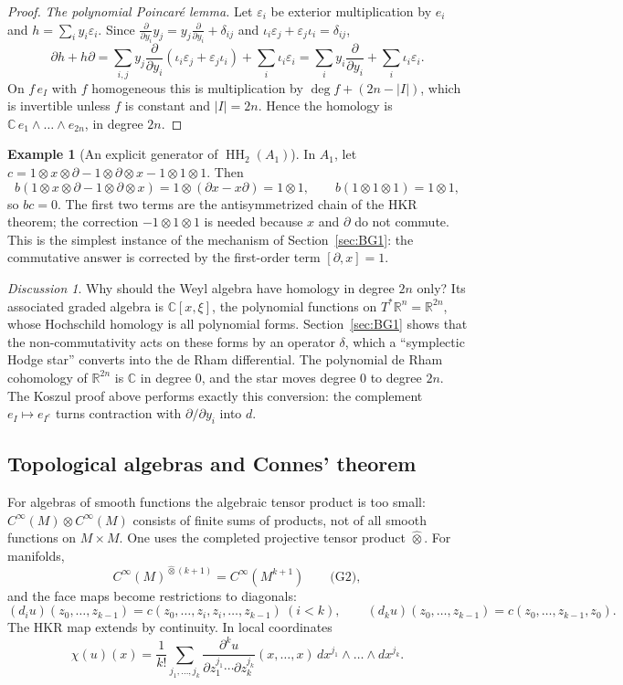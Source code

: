 \documentclass[11pt,oneside,reqno]{article}
\DeclareMathOperator{\HH}{HH}
\newcommand{\C}{\mathbb C}
\newcommand{\R}{\mathbb R}
\newcommand{\CI}{C^\infty}
\newcommand{\hot}{\mathbin{\widehat\otimes}}
\newcommand{\eps}{\varepsilon}
\newcommand{\pa}{\partial}
\theoremstyle{plain}
\theoremstyle{definition}
\newtheorem{example}[theorem]{Example}
\theoremstyle{remark}
\newtheorem*{discussion}{Discussion}
\begin{document}
\begin{proof}
\emph{The polynomial Poincaré lemma.} Let \(\eps_i\) be exterior
multiplication by \(e_i\) and \(h=\sum_iy_i\eps_i\). Since
\(\frac{\pa}{\pa y_i}y_j=y_j\frac{\pa}{\pa y_i}+\delta_{ij}\) and
\(\iota_i\eps_j+\eps_j\iota_i=\delta_{ij}\),
\[
 \pa h+h\pa=\sum_{i,j}y_j\frac{\pa}{\pa y_i}(\iota_i\eps_j+\eps_j\iota_i)
 +\sum_i\iota_i\eps_i=\sum_iy_i\frac{\pa}{\pa y_i}+\sum_i\iota_i\eps_i .
\]
On \(f\,e_I\) with \(f\) homogeneous this is multiplication by
\(\deg f+(2n-|I|)\), which is invertible unless \(f\) is constant and
\(|I|=2n\). Hence the homology is \(\C\,e_1\wedge\dots\wedge e_{2n}\), in
degree \(2n\).
\end{proof}

\begin{example}[An explicit generator of \(\HH_2(A_1)\)]\label{ex:weylcycle}
In \(A_1\), let \(c=1\otimes x\otimes\pa-1\otimes\pa\otimes x-1\otimes1\otimes1\).
Then
\[
 b(1\otimes x\otimes\pa-1\otimes\pa\otimes x)=1\otimes(\pa x-x\pa)=1\otimes1,
 \qquad b(1\otimes1\otimes1)=1\otimes1 ,
\]
so \(bc=0\). The first two terms are the antisymmetrized chain of the HKR
theorem; the correction \(-1\otimes1\otimes1\) is needed because
\(x\) and \(\pa\) do not commute. This is the simplest instance of the
mechanism of Section~\ref{sec:BG1}: the commutative answer is corrected by
the first-order term \([\pa,x]=1\).
\end{example}

\begin{discussion}
Why should the Weyl algebra have homology in degree \(2n\) only? Its
associated graded algebra is \(\C[x,\xi]\), the polynomial functions on
\(T^*\R^n=\R^{2n}\), whose Hochschild homology is all polynomial forms.
Section~\ref{sec:BG1} shows that the non-commutativity acts on these forms
by an operator \(\delta\), which a ``symplectic Hodge star'' converts into
the de Rham differential. The polynomial de Rham cohomology of
\(\R^{2n}\) is \(\C\) in degree \(0\), and the star moves degree \(0\) to
degree \(2n\). The Koszul proof above performs exactly this conversion: the
complement \(e_I\mapsto e_{I^c}\) turns contraction with \(\pa/\pa y_i\) into
\(d\).
\end{discussion}

\subsection{Topological algebras and Connes' theorem}\label{subsec:topological}
For algebras of smooth functions the algebraic tensor product is too
small: \(\CI(M)\otimes\CI(M)\) consists of finite sums of products, not of
all smooth functions on \(M\times M\). One uses the completed projective
tensor product \(\hot\). For manifolds,
\[
 \CI(M)^{\hot(k+1)}=\CI(M^{k+1})\qquad\text{(G2)},
\]
and the face maps become restrictions to diagonals:
\[
 (d_iu)(z_0,\dots,z_{k-1})=c(z_0,\dots,z_i,z_i,\dots,z_{k-1})\ (i<k),\qquad
 (d_ku)(z_0,\dots,z_{k-1})=c(z_0,\dots,z_{k-1},z_0).
\]
The HKR map extends by continuity. In local coordinates
\[
 \chi(u)(x)=\frac1{k!}\sum_{j_1,\dots,j_k}\frac{\pa^ku}{\pa z_1^{j_1}\cdots
 \pa z_k^{j_k}}(x,\dots,x)\,dx^{j_1}\wedge\dots\wedge dx^{j_k}.
\]
\end{document}
